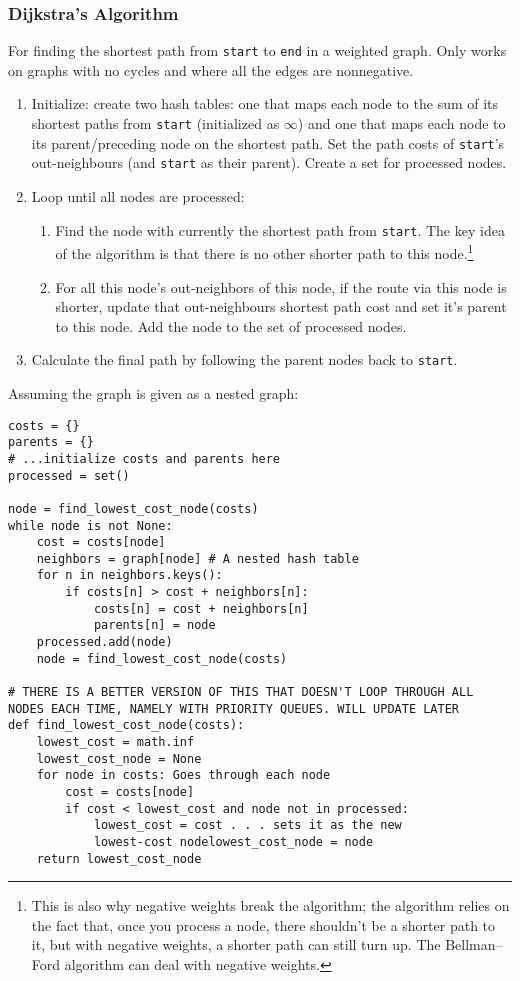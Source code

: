 \documentclass[8pt, table, xcdraw]{article}%
\begin{document}
\subsubsection{Dijkstra's Algorithm}

For finding the shortest path from \lstinline{start} to \lstinline{end} in a weighted graph. Only works on graphs with no cycles and where all the edges are nonnegative.

\begin{enumerate}
    \item Initialize: create two hash tables: one that maps each node to the sum of its shortest paths from \lstinline{start} (initialized as $\infty$) and one that maps each node to its parent/preceding node on the shortest path. Set the path costs of \lstinline{start}'s out-neighbours (and \lstinline{start} as their parent). Create a set for processed nodes.
    \item Loop until all nodes are processed:
    \begin{enumerate}
        \item Find the node with currently the shortest path from \lstinline{start}. The key idea of the algorithm is that there is no other shorter path to this node.\footnote{This is also why negative weights break the algorithm; the algorithm relies on the fact that, once you process a node, there shouldn't be a shorter path to it, but with negative weights, a shorter path can still turn up. The Bellman–Ford algorithm can deal with negative weights.}
        \item For all this node's out-neighbors of this node, if the route via this node is shorter, update that out-neighbours shortest path cost and set it's parent to this node. Add the node to the set of processed nodes.
    \end{enumerate}
    \item Calculate the final path by following the parent nodes back to \lstinline{start}.
\end{enumerate}

Assuming the graph is given as a nested graph:

\begin{lstlisting}
costs = {}
parents = {}
# ...initialize costs and parents here
processed = set()

node = find_lowest_cost_node(costs)
while node is not None:
    cost = costs[node]
    neighbors = graph[node] # A nested hash table
    for n in neighbors.keys():
        if costs[n] > cost + neighbors[n]:
            costs[n] = cost + neighbors[n]
            parents[n] = node
    processed.add(node)
    node = find_lowest_cost_node(costs)

# THERE IS A BETTER VERSION OF THIS THAT DOESN'T LOOP THROUGH ALL NODES EACH TIME, NAMELY WITH PRIORITY QUEUES. WILL UPDATE LATER
def find_lowest_cost_node(costs):
    lowest_cost = math.inf
    lowest_cost_node = None
    for node in costs: Goes through each node
        cost = costs[node]
        if cost < lowest_cost and node not in processed:
            lowest_cost = cost . . . sets it as the new
            lowest-cost nodelowest_cost_node = node
    return lowest_cost_node
\end{lstlisting}
\end{document}
